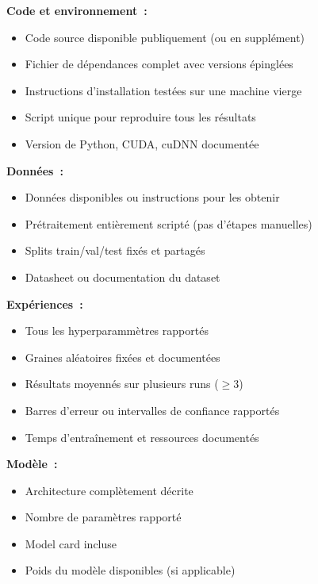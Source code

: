 \begin{bonnepratique}[title=\textbf{Checklist de reproductibilit\'e ML}]
\textbf{Code et environnement~:}
\begin{itemize}
  \item[$\square$] Code source disponible publiquement (ou en suppl\'ement)
  \item[$\square$] Fichier de d\'ependances complet avec versions \'epingl\'ees
  \item[$\square$] Instructions d'installation test\'ees sur une machine vierge
  \item[$\square$] Script unique pour reproduire tous les r\'esultats
  \item[$\square$] Version de Python, CUDA, cuDNN document\'ee
\end{itemize}
\textbf{Donn\'ees~:}
\begin{itemize}
  \item[$\square$] Donn\'ees disponibles ou instructions pour les obtenir
  \item[$\square$] Pr\'etraitement enti\`erement script\'e (pas d'\'etapes manuelles)
  \item[$\square$] Splits train/val/test fix\'es et partag\'es
  \item[$\square$] Datasheet ou documentation du dataset
\end{itemize}
\textbf{Exp\'eriences~:}
\begin{itemize}
  \item[$\square$] Tous les hyperparamm\`etres rapport\'es
  \item[$\square$] Graines al\'eatoires fix\'ees et document\'ees
  \item[$\square$] R\'esultats moyenn\'es sur plusieurs runs ($\geq 3$)
  \item[$\square$] Barres d'erreur ou intervalles de confiance rapport\'es
  \item[$\square$] Temps d'entra\^inement et ressources document\'es
\end{itemize}
\textbf{Mod\`ele~:}
\begin{itemize}
  \item[$\square$] Architecture compl\`etement d\'ecrite
  \item[$\square$] Nombre de param\`etres rapport\'e
  \item[$\square$] Model card incluse
  \item[$\square$] Poids du mod\`ele disponibles (si applicable)
\end{itemize}
\end{bonnepratique}

